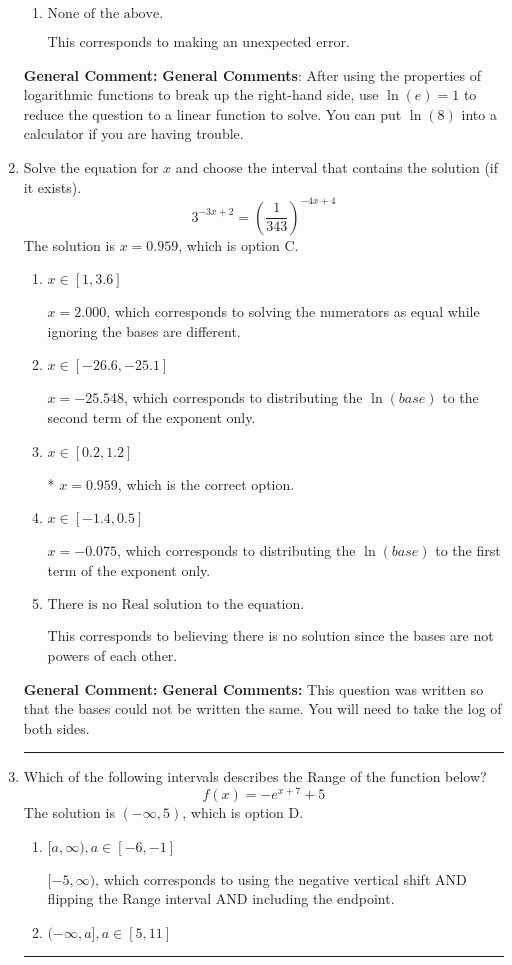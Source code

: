 \documentclass{extbook}[14pt]
\newcommand{\litem}[1]{\item #1

\rule{\textwidth}{0.4pt}}
\begin{document}
\begin{enumerate}
{\begin{enumerate}[label=\Alph*.]
This corresponds to believing you cannot solve the equation.
\item \( \text{None of the above.} \)

This corresponds to making an unexpected error.
\end{enumerate}

\textbf{General Comment:} \textbf{General Comments}: After using the properties of logarithmic functions to break up the right-hand side, use $\ln(e) = 1$ to reduce the question to a linear function to solve. You can put $\ln(8)$ into a calculator if you are having trouble.
}
\litem{
Solve the equation for $x$ and choose the interval that contains the solution (if it exists).
\[ 3^{-3x+2} = \left(\frac{1}{343}\right)^{-4x+4} \]The solution is \( x = 0.959 \), which is option C.\begin{enumerate}[label=\Alph*.]
\item \( x \in [1, 3.6] \)

$x = 2.000$, which corresponds to solving the numerators as equal while ignoring the bases are different.
\item \( x \in [-26.6, -25.1] \)

$x = -25.548$, which corresponds to distributing the $\ln(base)$ to the second term of the exponent only.
\item \( x \in [0.2, 1.2] \)

* $x = 0.959$, which is the correct option.
\item \( x \in [-1.4, 0.5] \)

$x = -0.075$, which corresponds to distributing the $\ln(base)$ to the first term of the exponent only.
\item \( \text{There is no Real solution to the equation.} \)

This corresponds to believing there is no solution since the bases are not powers of each other.
\end{enumerate}

\textbf{General Comment:} \textbf{General Comments:} This question was written so that the bases could not be written the same. You will need to take the log of both sides.
}
\litem{
Which of the following intervals describes the Range of the function below?
\[ f(x) = -e^{x+7}+5 \]The solution is \( (-\infty, 5) \), which is option D.\begin{enumerate}[label=\Alph*.]
\item \( [a, \infty), a \in [-6, -1] \)

$[-5, \infty)$, which corresponds to using the negative vertical shift AND flipping the Range interval AND including the endpoint.
\item \( (-\infty, a], a \in [5, 11] \)


\end{enumerate}}
\end{enumerate}
\end{document}
